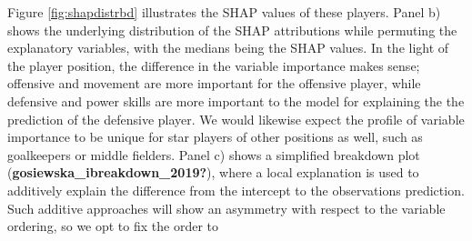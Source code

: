 \documentclass[
]{article}
\begin{document}
Figure \ref{fig:shapdistrbd} illustrates the SHAP values of these players. Panel b) shows the underlying distribution of the SHAP attributions while permuting the explanatory variables, with the medians being the SHAP values. In the light of the player position, the difference in the variable importance makes sense; offensive and movement are more important for the offensive player, while defensive and power skills are more important to the model for explaining the the prediction of the defensive player. We would likewise expect the profile of variable importance to be unique for star players of other positions as well, such as goalkeepers or middle fielders. Panel c) shows a simplified breakdown plot (\textbf{gosiewska\_ibreakdown\_2019?}), where a local explanation is used to additively explain the difference from the intercept to the observations prediction. Such additive approaches will show an asymmetry with respect to the variable ordering, so we opt to fix the order to
\end{document}
